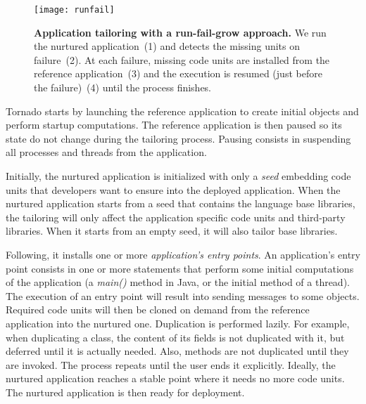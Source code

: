 
\begin{figure}[ht]
\begin{center}
\texttt{[image: runfail]}
\caption{\small \textbf{Application tailoring with a run-fail-grow approach.} We run the nurtured application~(1) and detects the missing units on failure~(2). At each failure, missing code units are installed from the reference application~(3) and the execution is resumed (just before the failure)~(4) until the process finishes. \label{fig:runfail}}
\end{center}
\end{figure}


Tornado starts by launching the reference application to create initial objects and perform startup computations. The reference application is then paused so its state do not change during the tailoring process. Pausing consists in suspending all processes and threads from the application.

Initially, the nurtured application is initialized with only a \emph{seed} embedding code units that developers want to ensure into the deployed application.
When the nurtured application starts from a seed that contains the language base libraries, the tailoring will only affect the application specific code units and third-party libraries.
When it starts from an empty seed, it will also tailor base libraries.

Following, it installs one or more \emph{application's entry points}.
An application's entry point consists in one or more statements that perform some initial computations of the application (\eg a \emph{main()} method in Java, or the initial method of a thread). 
The execution of an entry point will result into sending messages to some objects.
Required code units will then be cloned on demand from the reference application into the nurtured one.
Duplication is performed lazily.
For example, when duplicating a class, the content of its fields is not duplicated with it, but deferred until it is actually needed.
Also, methods are not duplicated until they are invoked.
The process repeats until the user ends it explicitly. Ideally, the nurtured application reaches a stable point where it needs no more code units.
The nurtured application is then ready for deployment.

